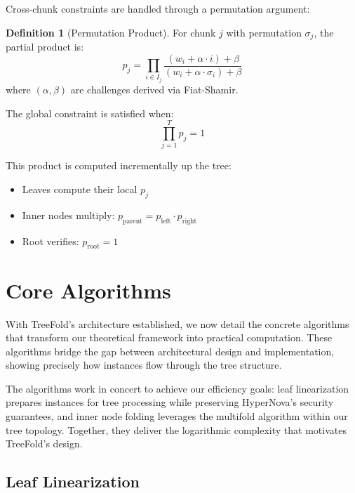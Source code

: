 \documentclass[11pt,a4paper]{article}
\theoremstyle{plain}
\theoremstyle{definition}
\newtheorem{definition}[theorem]{Definition}
\begin{document}
Cross-chunk constraints are handled through a permutation argument:

\begin{definition}[Permutation Product]
For chunk $j$ with permutation $\sigma_j$, the partial product is:
\begin{equation}
p_j = \prod_{i \in I_j} \frac{(w_i + \alpha \cdot i) + \beta}{(w_i + \alpha \cdot \sigma_i) + \beta}
\end{equation}
where $(\alpha, \beta)$ are challenges derived via Fiat-Shamir.
\end{definition}

The global constraint is satisfied when:
\begin{equation}
\prod_{j=1}^T p_j = 1
\end{equation}

This product is computed incrementally up the tree:
\begin{itemize}
\item Leaves compute their local $p_j$
\item Inner nodes multiply: $p_{\text{parent}} = p_{\text{left}} \cdot p_{\text{right}}$
\item Root verifies: $p_{\text{root}} = 1$
\end{itemize}

\section{Core Algorithms}

With TreeFold's architecture established, we now detail the concrete algorithms that transform our theoretical framework into practical computation. These algorithms bridge the gap between architectural design and implementation, showing precisely how instances flow through the tree structure.

The algorithms work in concert to achieve our efficiency goals: leaf linearization prepares instances for tree processing while preserving HyperNova's security guarantees, and inner node folding leverages the multifold algorithm within our tree topology. Together, they deliver the logarithmic complexity that motivates TreeFold's design.

\subsection{Leaf Linearization}
\end{document}
